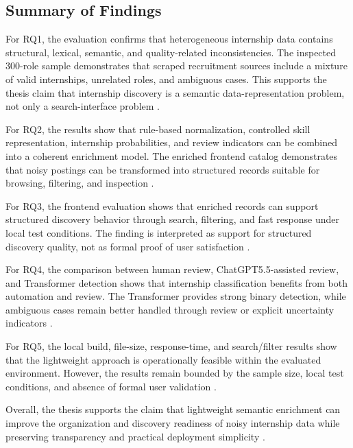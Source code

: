 \subsection{Summary of Findings}

For RQ1, the evaluation confirms that heterogeneous internship data contains structural,
lexical, semantic, and quality-related inconsistencies. The inspected 300-role sample
demonstrates that scraped recruitment sources include a mixture of valid internships,
unrelated roles, and ambiguous cases. This supports the thesis claim that internship discovery
is a semantic data-representation problem, not only a search-interface problem \cite{batini2009methodologies}.

For RQ2, the results show that rule-based normalization, controlled skill representation,
internship probabilities, and review indicators can be combined into a coherent enrichment
model. The enriched frontend catalog demonstrates that noisy postings can be transformed
into structured records suitable for browsing, filtering, and inspection \cite{doan2012principles, batini2009methodologies}.

For RQ3, the frontend evaluation shows that enriched records can support structured
discovery behavior through search, filtering, and fast response under local test conditions.
The finding is interpreted as support for structured discovery quality, not as formal
proof of user satisfaction \cite{manning2008introduction, jain1991art}.

For RQ4, the comparison between human review, ChatGPT5.5-assisted review, and
Transformer detection shows that internship classification benefits from both automation and
review. The Transformer provides strong binary detection, while ambiguous cases remain
better handled through review or explicit uncertainty indicators \cite{sokolova2009systematic, krippendorff2004content}.

For RQ5, the local build, file-size, response-time, and search/filter results show that the
lightweight approach is operationally feasible within the evaluated environment. However,
the results remain bounded by the sample size, local test conditions, and absence of formal
user validation \cite{jain1991art, schwartz2020green, wohlin2012experimentation}.

Overall, the thesis supports the claim that lightweight semantic enrichment can improve the
organization and discovery readiness of noisy internship data while preserving transparency
and practical deployment simplicity \cite{schwartz2020green, bass2012software}.

